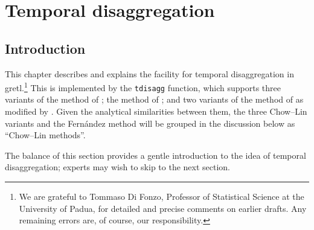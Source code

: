 \chapter{Temporal disaggregation}
\label{chap:tdisagg}

\newcommand{\Yb}{\mathbf{Y}}
\newcommand{\Xb}{\mathbf{X}}
\newcommand{\CXb}{\mathbf{CX}}
\newcommand{\Cb}{\mathbf{C}}
\newcommand{\Vb}{\mathbf{V}}
\newcommand{\Db}{\mathbf{D}}

\def\tditem[#1]#2{\item[{\tt #1}]#2}

\section{Introduction}
\label{sec:tdisagg-intro}

This chapter describes and explains the facility for temporal
disaggregation in gretl.\footnote{We are grateful to Tommaso Di Fonzo,
  Professor of Statistical Science at the University of Padua, for
  detailed and precise comments on earlier drafts. Any remaining
  errors are, of course, our responsibility.} This is implemented by
the \texttt{tdisagg} function, which supports three variants of the
method of \cite{chowlin71}; the method of \cite{fernandez81}; and two
variants of the method of \cite{denton71} as modified by
\cite{cholette84}. Given the analytical similarities between them, the
three Chow--Lin variants and the Fern\'andez method will be grouped in
the discussion below as ``Chow--Lin methods''.

The balance of this section provides a gentle introduction to the idea
of temporal disaggregation; experts may wish to skip to the next
section.

